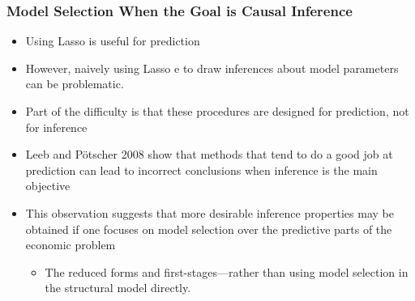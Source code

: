 \documentclass[
  shownotes,
  xcolor={svgnames},
  hyperref={colorlinks,citecolor=DarkBlue,linkcolor=DarkRed,urlcolor=DarkBlue}
  , aspectratio=169]{beamer}
\begin{document}
\begin{frame}[fragile]
\frametitle{Model Selection When the Goal is Causal Inference}
\begin{itemize}
\item Using Lasso is useful for prediction
\medskip
\item However, naively using Lasso e to draw inferences about model parameters can be problematic.
\medskip
\item Part of the difficulty is that these procedures are designed for prediction, not for inference  
\medskip
\item Leeb and Pötscher 2008 show that methods that tend to do a good job at prediction can lead to incorrect conclusions when inference is the main objective
\medskip
\item This observation suggests that more desirable inference properties may be obtained if one focuses on model selection over the predictive parts of the economic problem
\begin{itemize}
\item The reduced forms and first-stages—rather than using model selection in the structural model directly.
\end{itemize}

\end{itemize}

\end{frame}
\end{document}

